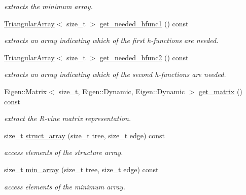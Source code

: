 \begin{DoxyCompactItemize}
\begin{DoxyCompactList}\small\item\em extracts the minimum array. \end{DoxyCompactList}\item 
\hyperlink{classvinecopulib_1_1_triangular_array}{Triangular\+Array}$<$ size\+\_\+t $>$ \hyperlink{classvinecopulib_1_1_r_vine_structure_a71e339dae0c4ea4338c731a0dfa70780}{get\+\_\+needed\+\_\+hfunc1} () const
\begin{DoxyCompactList}\small\item\em extracts an array indicating which of the first h-\/functions are needed. \end{DoxyCompactList}\item 
\hyperlink{classvinecopulib_1_1_triangular_array}{Triangular\+Array}$<$ size\+\_\+t $>$ \hyperlink{classvinecopulib_1_1_r_vine_structure_aa935d78845713014d7aaf6a6aa1a9a8f}{get\+\_\+needed\+\_\+hfunc2} () const
\begin{DoxyCompactList}\small\item\em extracts an array indicating which of the second h-\/functions are needed. \end{DoxyCompactList}\item 
\mbox{\label{classvinecopulib_1_1_r_vine_structure_a37325d7485875cf823c288400c351699}} 
Eigen\+::\+Matrix$<$ size\+\_\+t, Eigen\+::\+Dynamic, Eigen\+::\+Dynamic $>$ \hyperlink{classvinecopulib_1_1_r_vine_structure_a37325d7485875cf823c288400c351699}{get\+\_\+matrix} () const
\begin{DoxyCompactList}\small\item\em extract the R-\/vine matrix representation. \end{DoxyCompactList}\item 
size\+\_\+t \hyperlink{classvinecopulib_1_1_r_vine_structure_a00835cb9e06ca80bfff9c89100a1bb56}{struct\+\_\+array} (size\+\_\+t tree, size\+\_\+t edge) const
\begin{DoxyCompactList}\small\item\em access elements of the structure array. \end{DoxyCompactList}\item 
size\+\_\+t \hyperlink{classvinecopulib_1_1_r_vine_structure_a4c67417a03be525c7c64ebcc884b87fc}{min\+\_\+array} (size\+\_\+t tree, size\+\_\+t edge) const
\begin{DoxyCompactList}\small\item\em access elements of the minimum array. \end{DoxyCompactList}\item 

\end{DoxyCompactItemize}
